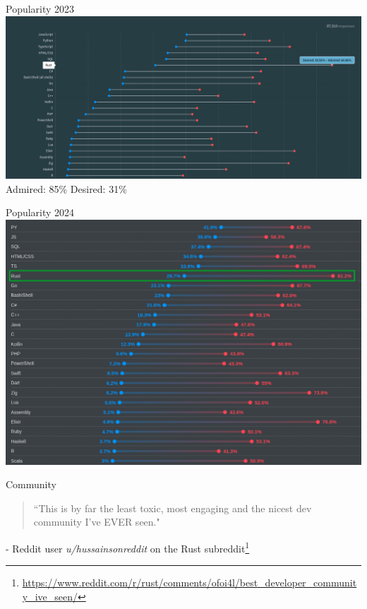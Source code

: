 \documentclass{beamer}
\begin{document}
\begin{frame}{Popularity 2023} 
\includegraphics[scale=0.2]{desired-admired-2023}
Admired: 85\%
Desired: 31\%\\
\end{frame} 

\begin{frame}{Popularity 2024} 
\includegraphics[scale=0.35]{desired-admired-2024}
\end{frame} 


\begin{frame}{Community} 
\begin{block}{}
\begin{quote}
``This is by far the least toxic, most engaging and the nicest dev community I've EVER seen."
\end{quote}
\end{block}
- Reddit user \emph{u/hussainsonreddit} on the Rust subreddit\footnote{\url{https://www.reddit.com/r/rust/comments/ofoi4l/best_developer_community_ive_seen/}}
\end{frame}
\end{document}
